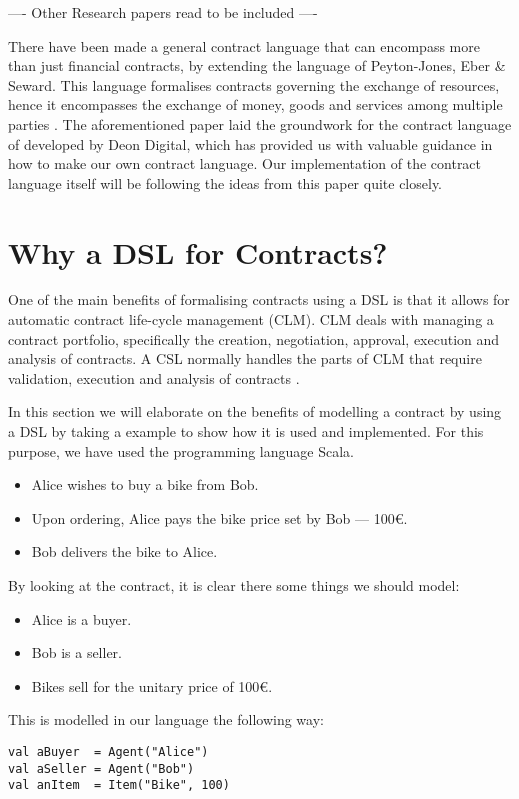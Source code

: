 \documentclass{ituthesis}
\begin{document}
---- Other Research papers read to be included ----

There have been made a general contract language that can encompass more than just financial contracts, by extending the language of Peyton-Jones, Eber \& Seward. This language formalises contracts governing the exchange of resources, hence it encompasses the exchange of money, goods and services among multiple parties \cite{andersen2006compositional}. The aforementioned paper laid the groundwork for the contract language of developed by Deon Digital, which has provided us with valuable guidance in how to make our own contract language. Our implementation of the contract language itself will be following the ideas from this paper quite closely.

\section{Why a DSL for Contracts?}
One of the main benefits of formalising contracts using a DSL is that it allows for automatic contract life-cycle management (CLM). CLM deals with managing a contract portfolio, specifically the creation, negotiation, approval, execution and analysis of contracts. A CSL normally handles the parts of CLM that require validation, execution and analysis of contracts \cite{hvitved2011contract}.

In this section we will elaborate on the benefits of modelling a contract by using a DSL by taking a example to show how it is used and implemented. For this purpose, we have used the programming language Scala. %

\begin{tcolorbox}
\begin{itemize}
    \item Alice wishes to buy a bike from Bob.
    \item Upon ordering, Alice pays the bike price set by Bob --- 100€.
    \item Bob delivers the bike to Alice.
\end{itemize}
\end{tcolorbox}

By looking at the contract, it is clear there some things we should model:
\begin{itemize}
    \item Alice is a buyer.
    \item Bob is a seller.
    \item Bikes sell for the unitary price of 100€.
\end{itemize}
This is modelled in our language the following way:
\begin{lstlisting}
val aBuyer  = Agent("Alice")
val aSeller = Agent("Bob")
val anItem  = Item("Bike", 100)
\end{lstlisting}
\end{document}
